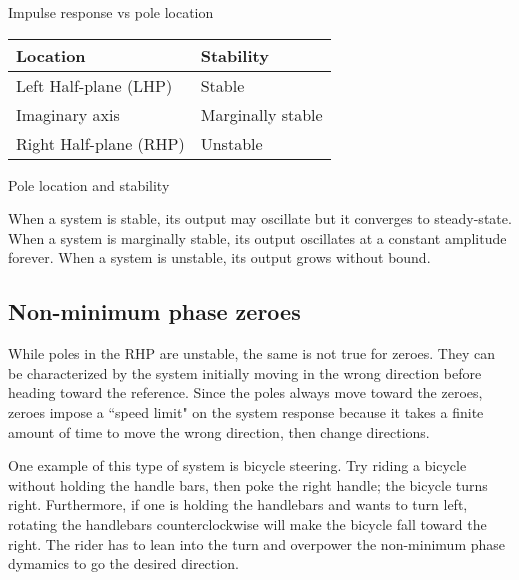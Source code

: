 \begin{bookfigure}

  \caption{Impulse response vs pole location}
  \label{fig:impulse_response_poles}
\end{bookfigure}

\begin{booktable}
  \begin{tabular}{|ll|}
    \hline
    \rowcolor{headingbg}
    \textbf{Location} & \textbf{Stability} \\
    \hline
    Left Half-plane (LHP) & Stable \\
    Imaginary axis & Marginally stable \\
    Right Half-plane (RHP) & Unstable \\
    \hline
  \end{tabular}

  \caption{Pole location and stability}
  \label{tab:pole_locations}
\end{booktable}

When a system is stable, its output may oscillate but it converges to
steady-state. When a system is marginally stable, its output oscillates at a
constant amplitude forever. When a system is unstable, its output grows without
bound.

\subsection{Non-minimum phase zeroes}

While poles in the RHP are unstable, the same is not true for zeroes. They can
be characterized by the \gls{system} initially moving in the wrong direction
before heading toward the \gls{reference}. Since the poles always move toward
the zeroes, zeroes impose a ``speed limit" on the \gls{system} response because
it takes a finite amount of time to move the wrong direction, then change
directions.

One example of this type of system is bicycle steering. Try riding a bicycle
without holding the handle bars, then poke the right handle; the bicycle turns
right. Furthermore, if one is holding the handlebars and wants to turn left,
rotating the handlebars counterclockwise will make the bicycle fall toward the
right. The rider has to lean into the turn and overpower the non-minimum phase
dymamics to go the desired direction.

